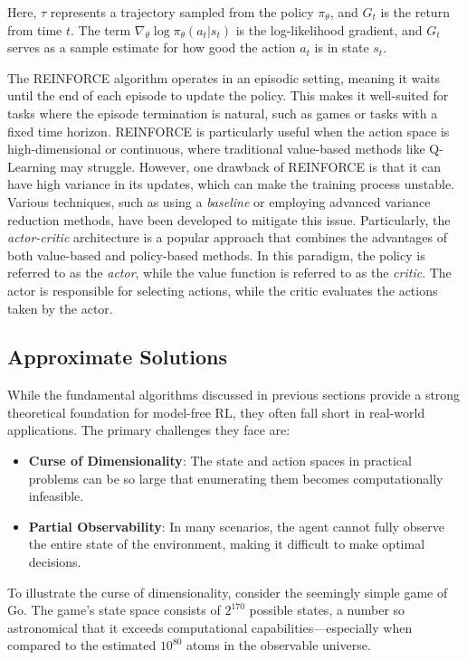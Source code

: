 Here, \(\tau\) represents a trajectory sampled from the policy \(\pi_\theta\), and \(G_t\) is the return from time \(t\). 
 The term \(\nabla_\theta \log \pi_\theta(a_t | s_t)\) is the log-likelihood gradient, 
 and \(G_t\) serves as a sample estimate for how good the action \(a_t\) is in state \(s_t\).

The REINFORCE algorithm operates in an episodic setting, 
 meaning it waits until the end of each episode to update the policy. 
 This makes it well-suited for tasks where the episode termination is natural, such as games or tasks with a fixed time horizon.
 REINFORCE is particularly useful when the action space is high-dimensional or continuous, where traditional value-based methods like Q-Learning may struggle.  
 However, one drawback of REINFORCE is that it can have high variance in its updates, which can make the training process unstable. 
 Various techniques, such as using a \emph{baseline} or employing advanced variance reduction methods, have been developed to mitigate this issue.
 Particularly, the \emph{actor-critic} architecture is a popular approach that combines the advantages of both value-based and policy-based methods.
 In this paradigm, the policy is referred to as the \emph{actor}, while the value function is referred to as the \emph{critic}.
The actor is responsible for selecting actions, while the critic evaluates the actions taken by the actor.

\subsection{Approximate Solutions}

While the fundamental algorithms discussed in previous sections provide a strong theoretical foundation for model-free RL, 
 they often fall short in real-world applications. 
 The primary challenges they face are:

\begin{itemize}
  \item \textbf{Curse of Dimensionality}: The state and action spaces in practical problems can be so large that enumerating them becomes computationally infeasible.
  \item \textbf{Partial Observability}: In many scenarios, the agent cannot fully observe the entire state of the environment, 
  making it difficult to make optimal decisions.
\end{itemize}
To illustrate the curse of dimensionality, 
 consider the seemingly simple game of Go. 
 The game's state space consists of \(2^{170}\) possible states, 
 a number so astronomical that it exceeds computational capabilities—especially when compared to the estimated \(10^{80}\) atoms in the observable universe.

